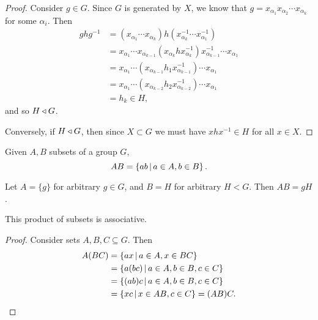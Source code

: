 \begin{proof}
    Consider $g \in G$. Since $G$ is generated by $X$, we know that $g = x_{\alpha_1}x_{\alpha_2}\cdots x_{\alpha_k}$ for some $\alpha_i$. Then
    \begin{align*}
        ghg^{-1} &= \left(x_{\alpha_1}\cdots x_{\alpha_k}\right)h\left(x_{\alpha_k}^{-1}\cdots x_{\alpha_1}^{-1}\right) \\
        &= x_{\alpha_1}\cdots x_{\alpha_{k-1}}\left(x_{\alpha_k}hx_{\alpha_k}^{-1}\right)x_{\alpha_{k-1}}^{-1}\cdots x_{\alpha_1} \\
        &= x_{\alpha_1}\cdots\left(x_{\alpha_{k-1}}h_1x_{\alpha_{k-1}}^{-1}\right)\cdots x_{\alpha_1} \\
        &= x_{\alpha_1}\cdots\left(x_{\alpha_{k-2}}h_2x_{\alpha_{k-2}}^{-1}\right)\cdots x_{\alpha_1} \\
        &= h_k \in H,
    \end{align*}
    and so $H \triangleleft G$.

    Conversely, if $H \triangleleft G$, then since $X \subset G$ we must have $xhx^{-1} \in H$ for all $x \in X$.
\end{proof}

\begin{defn}
    Given $A, B$ subsets of a group $G$,
    \[AB = \left\{ab \,\middle|\, a \in A, b \in B\right\}.\]
\end{defn}

\begin{exmp}
    Let $A = \{g\}$ for arbitrary $g \in G$, and $B = H$ for arbitrary $H < G$. Then $AB = gH$.
\end{exmp}

\begin{prop}
    This product of subsets is associative.
\end{prop}

\begin{proof}
    Consider sets $A, B, C \subseteq G$. Then
    \begin{align*}
        A(BC) &= \left\{ax \,\middle|\, a \in A, x \in BC\right\} \\
        &= \left\{a(bc) \,\middle|\, a \in A, b \in B, c \in C\right\} \\
        &= \left\{(ab)c \,\middle|\, a \in A, b \in B, c \in C\right\} \\
        &= \left\{xc \,\middle|\, x \in AB, c \in C\right\} = (AB)C.
    \end{align*}
\end{proof}

